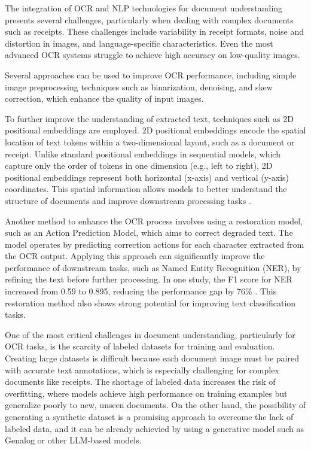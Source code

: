 \documentclass{SGGW-thesis-EN}
\begin{document}
The integration of OCR and NLP technologies for document understanding presents several challenges, 
particularly when dealing with complex documents such as receipts. 
These challenges include variability in receipt formats, noise and distortion in images, and language-specific characteristics. 
Even the most advanced OCR systems struggle to achieve high accuracy on low-quality images. 

Several approaches can be used to improve OCR performance, including simple image preprocessing techniques such as binarization, 
denoising, and skew correction, which enhance the quality of input images.

To further improve the understanding of extracted text, techniques such as 2D positional embeddings are employed. 
2D positional embeddings encode the spatial location of text tokens within a two-dimensional layout, such as a document or receipt. 
Unlike standard positional embeddings in sequential models, which capture only the order of tokens in one dimension (e.g., left to right), 
2D positional embeddings represent both horizontal (x-axis) and vertical (y-axis) coordinates. 
This spatial information allows models to better understand the structure of documents and improve downstream processing tasks \cite{subramani2021surveydeeplearningapproaches}.

Another method to enhance the OCR process involves using a restoration model, such as an Action Prediction Model, which aims to correct degraded text. 
The model operates by predicting correction actions for each character extracted from the OCR output. 
Applying this approach can significantly improve the performance of downstream tasks, such as Named Entity Recognition (NER), 
by refining the text before further processing. In one study, the F1 score for NER increased from 0.59 to 0.895, reducing the performance gap by 76\% \cite{gupte2021lightscameraactionframework}. 
This restoration method also shows strong potential for improving text classification tasks.

One of the most critical challenges in document understanding, particularly for OCR tasks, 
is the scarcity of labeled datasets for training and evaluation. 
Creating large datasets is difficult because each document image must be paired with accurate text annotations,
which is especially challenging for complex documents like receipts. \cite{subramani2021surveydeeplearningapproaches}
The shortage of labeled data increases the risk of overfitting, 
where models achieve high performance on training examples but generalize poorly to new, unseen documents.
On the other hand, the possibility of generating a synthetic dataset is a promising approach to overcome the lack of labeled data, 
and it can be already achievied by using a generative model such as Genalog \cite{gupte2021lightscameraactionframework} or other LLM-based models.
\end{document}
